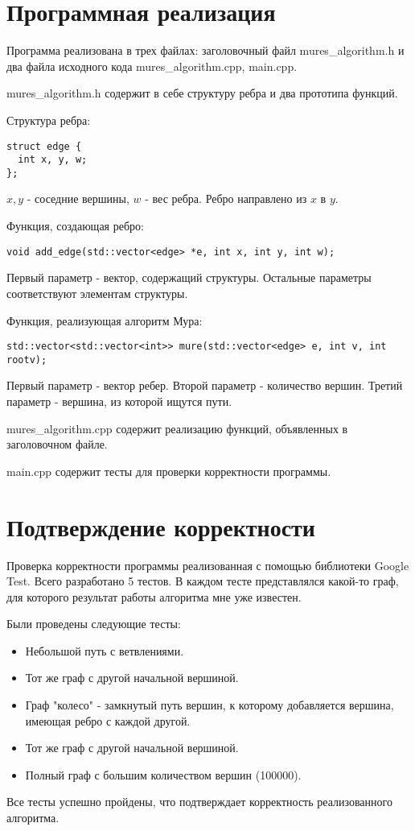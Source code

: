\documentclass{report}
\begin{document}
\section*{Программная реализация}
Программа реализована в трех файлах: заголовочный файл mures\_algorithm.h и два файла исходного кода mures\_algorithm.cpp, main.cpp.
\par mures\_algorithm.h содержит в себе структуру ребра и два прототипа функций.
\par Структура ребра:
\begin{lstlisting}
struct edge {
  int x, y, w;
};
\end{lstlisting}
$x,y$ - соседние вершины, $w$ - вес ребра. Ребро направлено из $x$ в $y$.
\par Функция, создающая ребро:
\begin{lstlisting}
void add_edge(std::vector<edge> *e, int x, int y, int w);
\end{lstlisting}
Первый параметр - вектор, содержащий структуры. Остальные параметры соответствуют элементам структуры.
\par Функция, реализующая алгоритм Мура:
\begin{lstlisting}
std::vector<std::vector<int>> mure(std::vector<edge> e, int v, int rootv);
\end{lstlisting}
Первый параметр - вектор ребер. Второй параметр - количество вершин. Третий параметр - вершина, из которой ищутся пути.
\par mures\_algorithm.cpp содержит реализацию функций, объявленных в заголовочном файле. 
\par main.cpp содержит тесты для проверки корректности программы.
\newpage

\section*{Подтверждение корректности}
Проверка корректности программы реализованная с помощью библиотеки Google Test. Всего разработано 5 тестов. В каждом тесте представлялся какой-то граф, для которого результат работы алгоритма мне уже известен.
\par Были проведены следующие тесты:
\begin{itemize}
  \item Небольшой путь с ветвлениями.
  \item Тот же граф с другой начальной вершиной.
  \item Граф "колесо" - замкнутый путь вершин, к которому добавляется вершина, имеющая ребро с каждой другой.
  \item Тот же граф с другой начальной вершиной.
  \item Полный граф с большим количеством вершин (100000).
\end{itemize}
\par Все тесты успешно пройдены, что подтверждает корректность реализованного алгоритма.
\newpage
\end{document}
